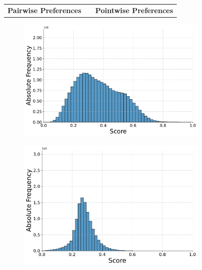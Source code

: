 \begin{figure}[ht!]
    \centering
    \begin{tabular}{ccc}
        \textbf{Pairwise Preferences} & \hspace{2cm} & \textbf{Pointwise Preferences} \\
    \end{tabular}
    \footnotesize
    \begin{subfigure}[b]{0.49\textwidth}
        \centering
        \includegraphics[width=\textwidth]{graphics/evaluation/pairwise_score_distribution_flan-t5-base.pdf}
        \label{fig:pairwise_flan-t5-base}
    \end{subfigure}
    \hfill
    \begin{subfigure}[b]{0.49\textwidth}
        \centering
        \includegraphics[width=\textwidth]{graphics/evaluation/pointwise_score_distribution_flan-t5-base.pdf}
        \label{fig:pointwise_flan-t5-base}
    \end{subfigure}


\end{figure}
